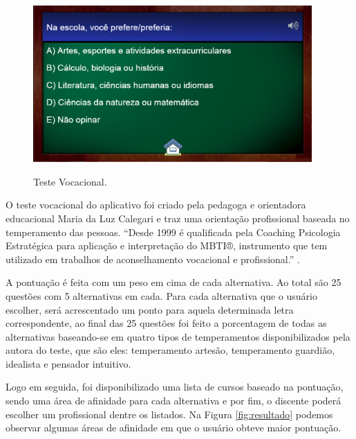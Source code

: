 \documentclass[
	12pt,				%
    oneside,			%
	a4paper,			%
	english,			%
	french,				%
	spanish,			%
	brazil,				%
	]{abntex2}
\begin{document}
\begin{figure}[H]
\centering
\caption{Teste Vocacional.}
\includegraphics[width=0.95\textwidth]{Questionario.PNG} %
\label{fig:testevocacional}
\end{figure}

O teste vocacional do aplicativo foi criado pela pedagoga e orientadora educacional Maria da Luz Calegari e traz uma orientação profissional baseada no temperamento das pessoas. “Desde 1999 é qualificada pela Coaching Psicologia Estratégica para aplicação e interpretação do MBTI®, instrumento que tem utilizado em trabalhos de aconselhamento vocacional e profissional.” \cite{maria}.

A pontuação é feita com um peso em cima de cada alternativa. Ao total são 25 questões com 5 alternativas em cada. Para cada alternativa que o usuário escolher, será acrescentado um ponto para aquela determinada letra correspondente, ao final das 25 questões foi feito a porcentagem de todas as alternativas baseando-se em quatro tipos de temperamentos disponibilizados pela autora do teste, que são eles: temperamento artesão, temperamento guardião, idealista e pensador intuitivo.

Logo em seguida, foi disponibilizado uma lista de cursos baseado na pontuação, sendo uma área de afinidade para cada alternativa e por fim, o discente poderá escolher um profissional dentre os listados. Na Figura \ref{fig:resultado} podemos observar algumas áreas de afinidade em que o usuário obteve maior pontuação.
\end{document}
